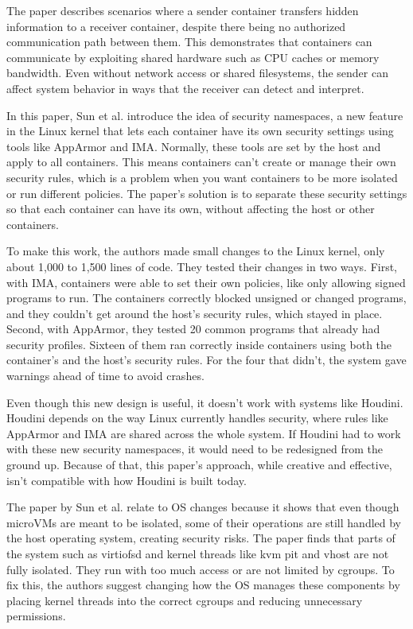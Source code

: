 \documentclass[12pt]{report}
\begin{document}
\begin{doublespace}
The paper describes scenarios where a sender container transfers hidden information to a receiver container, despite there being no authorized communication path between them. This demonstrates that containers can communicate by exploiting shared hardware such as CPU caches or memory bandwidth. Even without network access or shared filesystems, the sender can affect system behavior in ways that the receiver can detect and interpret.

In this paper, Sun et al. \cite{sun2018security} introduce the idea of security namespaces, a new feature in the Linux kernel that lets each container have its own security settings using tools like AppArmor and IMA. Normally, these tools are set by the host and apply to all containers. This means containers can’t create or manage their own security rules, which is a problem when you want containers to be more isolated or run different policies. The paper’s solution is to separate these security settings so that each container can have its own, without affecting the host or other containers.

To make this work, the authors made small changes to the Linux kernel, only about 1,000 to 1,500 lines of code. They tested their changes in two ways. First, with IMA, containers were able to set their own policies, like only allowing signed programs to run. The containers correctly blocked unsigned or changed programs, and they couldn’t get around the host’s security rules, which stayed in place. Second, with AppArmor, they tested 20 common programs that already had security profiles. Sixteen of them ran correctly inside containers using both the container’s and the host’s security rules. For the four that didn’t, the system gave warnings ahead of time to avoid crashes.

Even though this new design is useful, it doesn’t work with systems like Houdini. Houdini depends on the way Linux currently handles security, where rules like AppArmor and IMA are shared across the whole system. If Houdini had to work with these new security namespaces, it would need to be redesigned from the ground up. Because of that, this paper’s approach, while creative and effective, isn’t compatible with how Houdini is built today.

The paper by Sun et al. \cite{sun2018security} relate to OS changes because it shows that even though microVMs are meant to be isolated, some of their operations are still handled by the host operating system, creating security risks. The paper finds that parts of the system such as virtiofsd and kernel threads like kvm pit and vhost are not fully isolated. They run with too much access or are not limited by cgroups. To fix this, the authors suggest changing how the OS manages these components by placing kernel threads into the correct cgroups and reducing unnecessary permissions.



\end{doublespace}
\end{document}

